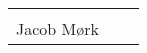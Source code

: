 \begin{table}[b]
	\centering
		\begin{tabular}{c c c}
			\underline{\phantom{mmmmmmmmmmmmmm}} \\
			Jacob Mørk	
		\end{tabular}
\end{table}
